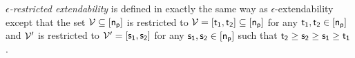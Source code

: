 \begin{definition} 
\label{def:resext}
\emph{$\epsilon$-restricted extendability} is defined in exactly the same way as $\epsilon$-extendability except that the set $\mathcal{V} \subseteq [\mathsf{n_p}]$ is restricted to $\mathcal{V} = [\mathsf{t_1}, \mathsf{t_2}] \subseteq [\mathsf{n_p}]$ for any $\mathsf{t_1}, \mathsf{t_2} \in [\mathsf{n_p}]$ and $\mathcal{V}'$ is restricted to $\mathcal{V}' = [\mathsf{s_1}, \mathsf{s_2}]$ for any $\mathsf{s_1}, \mathsf{s_2} \in [\mathsf{n_p}]$ such that $\mathsf{t_2}\geq\mathsf{s_2}\geq\mathsf{s_1} \geq \mathsf{t_1}$.
\end{definition}


